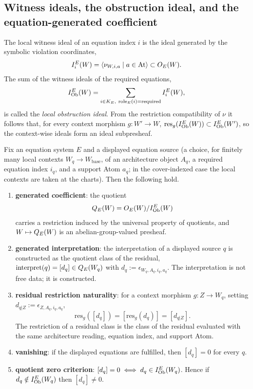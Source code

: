 \subsection{Witness ideals, the obstruction ideal, and the equation-generated coefficient}\label{sec:36}

\begin{definition}\label{def:witnessideal}
The local witness ideal of an equation index $i$ is the ideal generated
by the symbolic violation coordinates,
\[
I_i^E(W)=\langle \nu_{W,i,a}\mid a\in \mathrm{At}\rangle\subset O_{E}(W).
\]
The sum of the witness ideals of the required equations,
\[
I_{\mathrm{Ob}}^{E}(W)=\sum_{i\in K_E,\ \mathrm{role}_E(i)=\mathrm{required}} I_i^E(W),
\]
is called the \emph{local obstruction ideal}. From the restriction
compatibility of $\nu$ it follows that, for every context morphism
$g:W'\to W$, $\mathrm{res}_g(I_{\mathrm{Ob}}^{E}(W))\subset I_{\mathrm{Ob}}^{E}(W')$, so the
context-wise ideals form an ideal subpresheaf.
\end{definition}

\begin{theorem}\label{thm:quotient}
Fix an equation system $E$ and a displayed equation source (a choice, for
finitely many local contexts $W_q\to W_{\mathrm{base}}$, of an
architecture object $A_q$, a required equation index $i_q$, and a support Atom
$a_q$; in the cover-indexed case the local contexts are taken at the
charts). Then the following hold.
\begin{enumerate}
\item \textbf{generated coefficient}: the quotient
\[
Q_{E}(W)=O_{E}(W)/I_{\mathrm{Ob}}^{E}(W)
\]
carries a restriction induced by the universal property of quotients,
and $W\mapsto Q_{E}(W)$ is an abelian-group-valued presheaf.
\item \textbf{generated interpretation}: the interpretation of a
displayed source $q$ is constructed as the quotient class of the
residual, $\mathrm{interpret}(q)=[d_q]\in Q_{E}(W_q)$ with
$d_q:=\epsilon_{W_q,A_q,i_q,a_q}$. The interpretation is not free data;
it is constructed.
\item \textbf{residual restriction naturality}: for a context morphism
$g:Z\to W_q$, setting $d_{q|Z}:=\epsilon_{Z,A_q,i_q,a_q}$,
\[
\mathrm{res}_g([d_q])=[\mathrm{res}_g(d_q)]=[d_{q|Z}].
\]
The restriction of a residual class is the class of the residual
evaluated with the same architecture reading, equation index, and
support Atom.
\item \textbf{vanishing}: if the displayed equations are fulfilled, then
$[d_q]=0$ for every $q$.
\item \textbf{quotient zero criterion}: $[d_q]=0 \iff d_q\in I_{\mathrm{Ob}}^{E}(W_q)$.
Hence if $d_q\notin I_{\mathrm{Ob}}^{E}(W_q)$ then $[d_q]\neq0$.
\end{enumerate}
\end{theorem}

